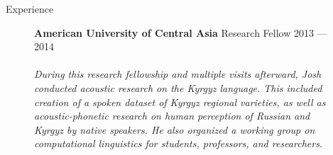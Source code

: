 \documentclass{resume} %
\begin{document}
\begin{rSection}{Experience}
  \begin{figure}[H]
    \begin{minipage}{0.2\textwidth}
      \centering
      
    \end{minipage}
    \begin{minipage}{0.8\textwidth}
      {\bf American University of Central Asia} \hfill Research Fellow  \hfill {2013 --- 2014} \\ \\
      \textit{During this research fellowship and multiple visits afterward, Josh conducted acoustic research on the Kyrgyz language. This included creation of a spoken dataset of Kyrgyz regional varieties, as well as acoustic-phonetic research on human perception of Russian and Kyrgyz by native speakers. He also organized a working group on computational linguistics for students, professors, and researchers.}
    \end{minipage}
  \end{figure}

\end{rSection}
\end{document}
